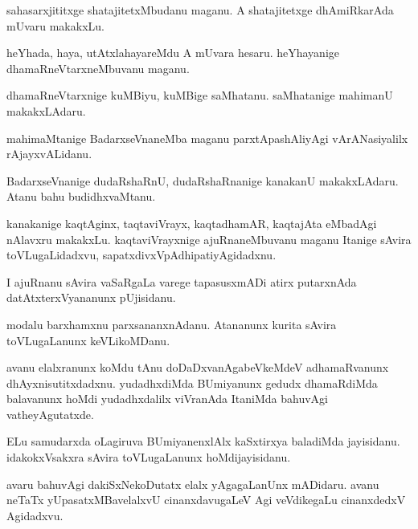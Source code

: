 \documentclass{article}
\begin{document}
\begin{mn}
sahasarxjititxge shatajitetxMbudanu maganu. A shatajitetxge
dhAmiRkarAda mUvaru makakxLu.
\end{mn}

\begin{mn}
heYhada, haya, utAtxlahayareMdu A mUvara hesaru. heYhayanige
dhamaRneVtarxneMbuvanu maganu.
\end{mn}

\begin{mn}
dhamaRneVtarxnige kuMBiyu, kuMBige saMhatanu. saMhatanige mahimanU makakxLAdaru.
\end{mn}

\begin{mn}
mahimaMtanige BadarxseVnaneMba maganu parxtApashAliyAgi vArANasiyalilx rAjayxvALidanu.
\end{mn}

\begin{mn}
BadarxseVnanige dudaRshaRnU, dudaRshaRnanige kanakanU
makakxLAdaru. Atanu bahu budidhxvaMtanu.
\end{mn}

\begin{mn}%
kanakanige kaqtAginx, taqtaviVrayx, kaqtadhamAR, kaqtajAta eMbadAgi
nAlavxru makakxLu. kaqtaviVrayxnige ajuRnaneMbuvanu maganu Itanige
sAvira toVLugaLidadxvu, sapatxdivxVpAdhipatiyAgidadxnu.
\end{mn}

\begin{mn}
I ajuRnanu sAvira vaSaRgaLa varege tapasusxmADi atirx putarxnAda
datAtxterxVyananunx pUjisidanu.
\end{mn}

\begin{mn}%
modalu barxhamxnu parxsananxnAdanu. Atananunx kurita sAvira
toVLugaLanunx keVLikoMDanu.
\end{mn}

\begin{mn}
avanu elalxranunx koMdu tAnu doDaDxvanAgabeVkeMdeV adhamaRvanunx
dhAyxnisutitxdadxnu. yudadhxdiMda BUmiyanunx gedudx dhamaRdiMda
balavanunx hoMdi yudadhxdalilx viVranAda ItaniMda bahuvAgi vatheyAgutatxde.
\end{mn}

\begin{mn}%
ELu samudarxda oLagiruva BUmiyanenxlAlx kaSxtirxya baladiMda
jayisidanu. idakokxVsakxra sAvira toVLugaLanunx hoMdijayisidanu.
\end{mn}

\begin{mn}
avaru bahuvAgi dakiSxNekoDutatx elalx yAgagaLanUnx mADidaru. avanu
neTaTx yUpasatxMBavelalxvU cinanxdavugaLeV Agi veVdikegaLu cinanxdedxV Agidadxvu.
\end{mn}
\end{document}
